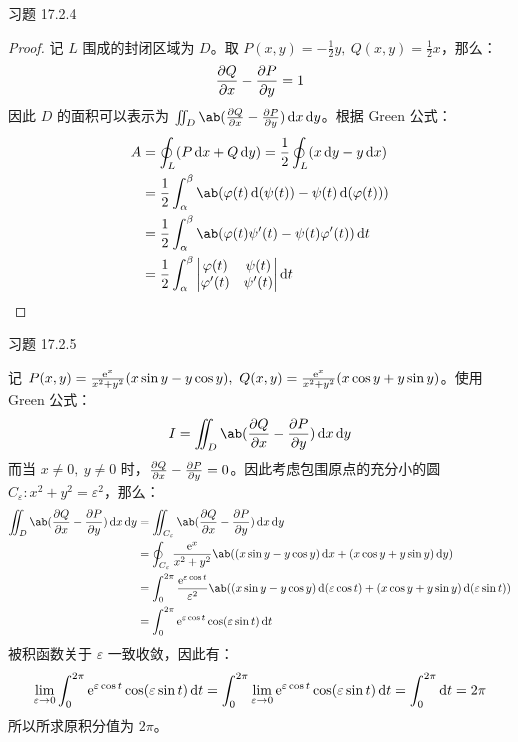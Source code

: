 \begin{problem}
	习题 17.2.4
	\begin{proof}
		记 $L$ 围成的封闭区域为 $D$。取 $P(x, y) = -\frac{1}{2} y,\ Q(x, y) = \frac{1}{2} x$，那么：
		$$
		\pdv{Q}{x} - \pdv{P}{y} = 1
		$$
		因此 $D$ 的面积可以表示为 $\iint_D \ab(\pdv{Q}{x} - \pdv{P}{y}) \dd{x} \dd{y}$。根据 Green 公式：
		$$
		\begin{aligned}
			A & = \oint_L (P \dd{x} + Q \dd{y}) = \frac{1}{2} \oint_L (x \dd{y} - y \dd{x}) \\
			& = \frac{1}{2} \int_{\alpha}^{\beta} \ab(\varphi(t) \dd(\psi(t)) - \psi(t) \dd(\varphi(t))) \\
			& = \frac{1}{2} \int_{\alpha}^{\beta} \ab(\varphi(t) \psi'(t) - \psi(t) \varphi'(t)) \dd{t} \\
			& = \frac{1}{2} \int_{\alpha}^{\beta} \begin{vmatrix}
				\varphi(t) & \psi(t) \\
				\varphi'(t) & \psi'(t) 
			\end{vmatrix} \dd{t}
		\end{aligned}
		$$
	\end{proof}
\end{problem}

\begin{problem}
	习题 17.2.5
	\begin{solution}
		记 $P(x, y) = \frac{\mathrm{e}^{x}}{x^2 + y^2} (x \sin y - y \cos y),\ Q(x, y) = \frac{\mathrm{e}^{x}}{x^2 + y^2} (x \cos y + y \sin y)$。使用 Green 公式：
		$$
		I = \iint_D \ab(\pdv{Q}{x} - \pdv{P}{y}) \dd{x} \dd{y}
		$$
		而当 $x \neq 0,\ y \neq 0$ 时，$\pdv{Q}{x} - \pdv{P}{y} = 0$。因此考虑包围原点的充分小的圆 $C_\varepsilon: x^2 + y^2 = \varepsilon^2$，那么：
		$$
		\begin{aligned}
			\iint_D \ab(\pdv{Q}{x} - \pdv{P}{y}) \dd{x} \dd{y} & = \iint_{C_{\varepsilon}} \ab(\pdv{Q}{x} - \pdv{P}{y}) \dd{x} \dd{y} \\
			& = \oint_{C_{\varepsilon}} \frac{\E^{x}}{x^2 + y^2} \ab((x \sin y - y \cos y) \dd{x} + (x \cos y + y \sin y) \dd{y}) \\
			& = \int_{0}^{2\pi} \frac{\E^{\varepsilon \cos t}}{\varepsilon^2} \ab((x \sin y - y \cos y) \dd(\varepsilon \cos t) + (x \cos y + y \sin y) \dd(\varepsilon \sin t)) \\
			& = \int_{0}^{2\pi} \E^{\varepsilon \cos t} \cos (\varepsilon \sin t) \dd{t}
		\end{aligned}
		$$
		被积函数关于 $\varepsilon$ 一致收敛，因此有：
		$$
		\lim_{\varepsilon \to 0} \int_{0}^{2\pi} \mathrm{e}^{\varepsilon \cos t} \cos (\varepsilon \sin t) \dd{t} = \int_{0}^{2\pi} \lim_{\varepsilon \to 0}  \mathrm{e}^{\varepsilon \cos t} \cos (\varepsilon \sin t) \dd{t} = \int_{0}^{2\pi} \dd{t} = 2\pi
		$$
		所以所求原积分值为 $2\pi$。
	\end{solution}
\end{problem}

